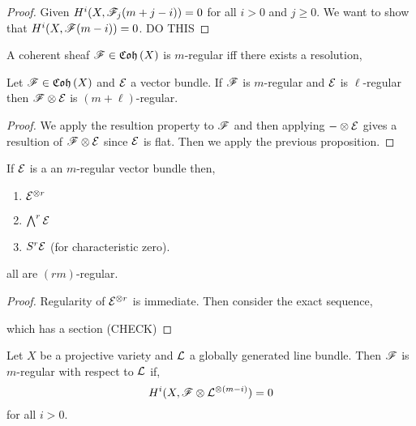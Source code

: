 \documentclass[12pt]{article}
\begin{document}
\begin{proof}
Given $H^i(X, \mathscr{F}_j(m + j - i)) = 0$ for all $i > 0$ and $j \ge 0$. We want to show that $H^i(X, \mathscr{F}(m-i)) = 0$. DO THIS
\end{proof}

\begin{prop}
A coherent sheaf $\mathscr{F} \in \mathfrak{Coh}\left(X\right)$ is $m$-regular iff there exists a resolution,
\begin{center}
\end{center}
\end{prop}

\begin{prop}
Let $\mathscr{F} \in \mathfrak{Coh}\left(X\right)$ and $\mathcal{E}$ a vector bundle. If $\mathscr{F}$ is $m$-regular and $\mathcal{E}$ is $\ell$-regular then $\mathscr{F} \otimes \mathcal{E}$ is $(m+\ell)$-regular.
\end{prop}

\begin{proof}
We apply the resultion property to $\mathscr{F}$ and then applying $- \otimes \mathcal{E}$ gives a resultion of $\mathscr{F} \otimes \mathcal{E}$ since $\mathcal{E}$ is flat. Then we apply the previous proposition. 
\end{proof}

\begin{cor}
If $\mathcal{E}$ is a an $m$-regular vector bundle then,
\begin{enumerate}
\item $\mathcal{E}^{\otimes r}$
\item $\bigwedge^r \mathcal{E}$
\item $S^r \mathcal{E}$ (for characteristic zero).
\end{enumerate}
all are $(rm)$-regular. 
\end{cor}

\begin{proof}
Regularity of $\mathcal{E}^{\otimes r}$ is immediate. Then consider the exact sequence,
\begin{center}
\end{center}
which has a section (CHECK)
\end{proof}

\begin{defn}
Let $X$ be a projective variety and $\mathcal{L}$ a globally generated line bundle. Then $\mathscr{F}$ is $m$-regular with respect to $\mathcal{L}$ if,
\[ H^i(X, \mathscr{F} \otimes \mathcal{L}^{\otimes (m-i)}) = 0 \]
for all $i > 0$.
\end{defn}
\end{document}
